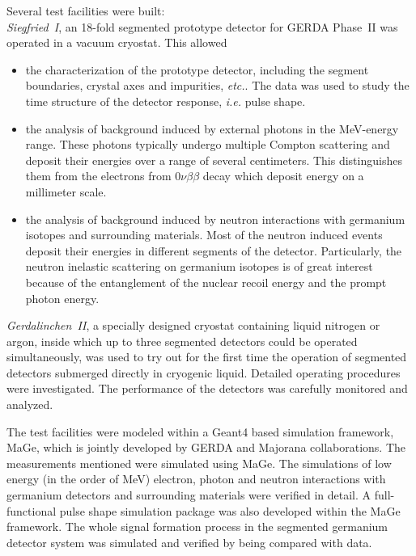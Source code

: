 Several test facilities were built:\\
\emph{Siegfried~I}, an 18-fold segmented prototype detector for GERDA Phase~II was operated in a vacuum cryostat. This allowed
\begin{itemize}
\item the characterization of the prototype detector, including the segment boundaries, crystal axes and impurities, \textit{etc.}. The data was used to study the time structure of the detector response, \textit{i.e.} pulse shape. 
\item the analysis of background induced by external photons in the MeV-energy range. These photons typically undergo multiple Compton scattering and deposit their energies over a range of several centimeters. This distinguishes them from the electrons from $0\nu\beta\beta$ decay which deposit energy on a millimeter scale.
\item the analysis of background induced by neutron interactions with germanium isotopes and surrounding materials. Most of the neutron induced events deposit their energies in different segments of the detector. Particularly, the neutron inelastic scattering on germanium isotopes is of great interest because of the entanglement of the nuclear recoil energy and the prompt photon energy.
\end{itemize}
\emph{Gerdalinchen~II}, a specially designed cryostat containing liquid nitrogen or argon, inside which up to three segmented detectors could be operated simultaneously, was used to try out for the first time the operation of segmented detectors submerged directly in cryogenic liquid. Detailed operating procedures were investigated. The performance of the detectors was carefully monitored and analyzed.

The test facilities were modeled within a Geant4 based simulation framework, MaGe, which is jointly developed by GERDA and Majorana collaborations. The measurements mentioned were simulated using MaGe. The simulations of low energy (in the order of MeV) electron, photon and neutron interactions with germanium detectors and surrounding materials were verified in detail. A full-functional pulse shape simulation package was also developed within the MaGe framework. The whole signal formation process in the segmented germanium detector system was simulated and verified by being compared with data. 


